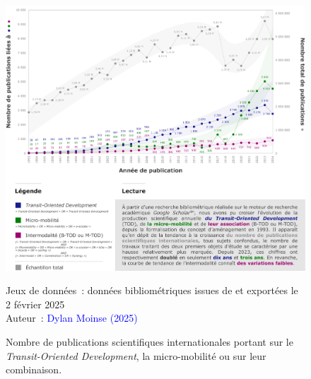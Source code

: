 \begin{refsegment}
    \begin{figure}[h!]\vspace*{4pt}
        \caption{Nombre de publications scientifiques internationales portant sur le \textsl{Transit-Oriented Development}, la micro-mobilité ou sur leur combinaison.}
        \label{fig-chap1:trends-google-scholar}
        \centerline{\includegraphics[width=1\columnwidth]{src/Figures/Chap-1/FR_Chronologie_publications_TOD_MIL.pdf}}
        \vspace{5pt}
        \begin{flushright}\scriptsize{
        Jeux de données~: données bibliométriques issues de  et exportées le 2 février 2025
        \\
        Auteur~: \textcolor{blue}{Dylan Moinse (2025)}
      }\end{flushright}
    \end{figure}


\end{refsegment}
